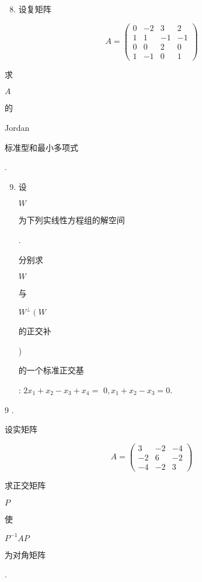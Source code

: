 \documentclass[10pt]{article}
\begin{document}
\begin{enumerate}
  \setcounter{enumi}{7}
  \item \begin{CJK}{UTF8}{mj}设复矩阵\end{CJK}
\end{enumerate}
$$
A=\left(\begin{array}{cccc}
0 & -2 & 3 & 2 \\
1 & 1 & -1 & -1 \\
0 & 0 & 2 & 0 \\
1 & -1 & 0 & 1
\end{array}\right)
$$
\begin{CJK}{UTF8}{mj}求\end{CJK} $A$ \begin{CJK}{UTF8}{mj}的\end{CJK} Jordan \begin{CJK}{UTF8}{mj}标准型和最小多项式\end{CJK}.

\begin{enumerate}
  \setcounter{enumi}{8}
  \item \begin{CJK}{UTF8}{mj}设\end{CJK} $W$ \begin{CJK}{UTF8}{mj}为下列实线性方程组的解空间\end{CJK}. \begin{CJK}{UTF8}{mj}分别求\end{CJK} $W$ \begin{CJK}{UTF8}{mj}与\end{CJK} $W^{\perp}\left(W\right.$ \begin{CJK}{UTF8}{mj}的正交补\end{CJK}) \begin{CJK}{UTF8}{mj}的一个标准正交基\end{CJK}: $2 x_{1}+x_{2}-x_{3}+x_{4}=$ $0, x_{1}+x_{2}-x_{3}=0$.
\end{enumerate}
9 . \begin{CJK}{UTF8}{mj}设实矩阵\end{CJK}
$$
A=\left(\begin{array}{ccc}
3 & -2 & -4 \\
-2 & 6 & -2 \\
-4 & -2 & 3
\end{array}\right)
$$
\begin{CJK}{UTF8}{mj}求正交矩阵\end{CJK} $P$ \begin{CJK}{UTF8}{mj}使\end{CJK} $P^{-1} A P$ \begin{CJK}{UTF8}{mj}为对角矩阵\end{CJK}.
\end{document}
